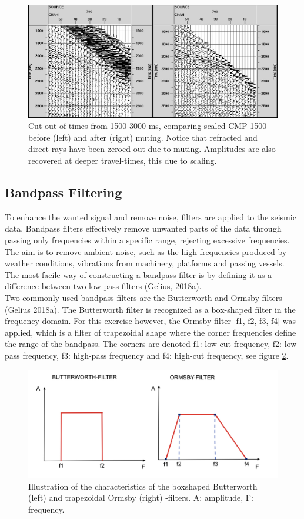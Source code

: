 \documentclass[10pt,a4paper]{article}
\begin{document}
\begin{figure}[H]
\includegraphics[width=\textwidth]{fig8.jpg}
\caption{Cut-out of times from 1500-3000 ms, comparing scaled CMP 1500 before (left) and after (right) muting. Notice that refracted and direct rays have been zeroed out due to muting. Amplitudes are also recovered at deeper travel-times, this due to scaling.}
\label{fig8}
\end{figure}

\subsection{Bandpass Filtering}


To enhance the wanted signal and remove noise, filters are applied to the seismic data. Bandpass filters effectively remove unwanted parts of the data through passing only frequencies within a specific range, rejecting excessive frequencies. The aim is to remove ambient noise, such as the high frequencies produced by weather conditions, vibrations from machinery, platforms and passing vessels. The most facile way of constructing a bandpass filter is by defining it as a difference between two low-pass filters (Gelius, 2018a). 
\\
Two commonly used bandpass filters are the Butterworth and Ormsby-filters (Gelius 2018a). The Butterworth filter is recognized as a box-shaped filter in the frequency domain. For this exercise however, the Ormsby filter [f1, f2, f3, f4] was applied, which is a filter of trapezoidal shape where the corner frequencies define the range of the bandpass. The corners are denoted f1: low-cut frequency, f2: low-pass frequency, f3: high-pass frequency and f4: high-cut frequency, see figure \ref{fig9}.

\begin{figure}[H]
\includegraphics[width=\textwidth]{fig9.jpg}
\caption{Illustration of the characteristics of the boxshaped Butterworth (left) and trapezoidal Ormsby (right) -filters. A: amplitude, F: frequency.}
\label{fig9}
\end{figure}
\end{document}
